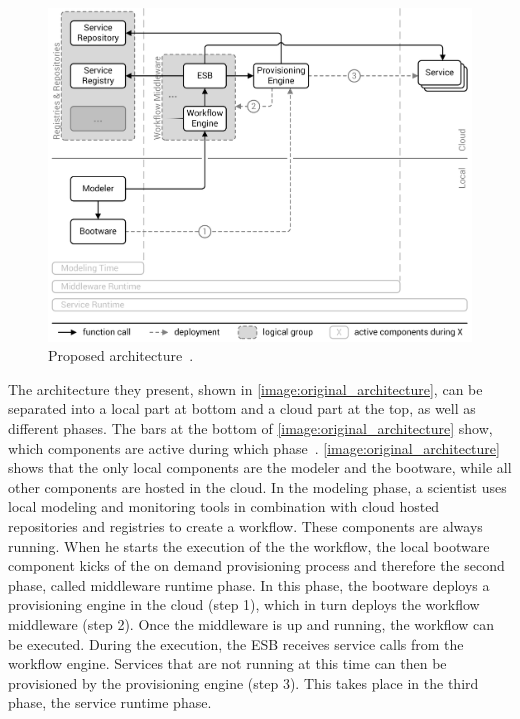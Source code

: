 \begin{figure}[!htbp]
	\centering
	\includegraphics[resolution=600]{previous/assets/original_architecture}
	\caption{Proposed architecture~\autocite[based on][]{provisioning:ondemand}.}
	\label{image:original_architecture}
\end{figure}

The architecture they present, shown in \autoref{image:original_architecture}, can be separated into a local part at bottom and a cloud part at the top, as well as different phases.
The bars at the bottom of \autoref{image:original_architecture} show, which components are active during which phase~\autocite{provisioning:ondemand}.
\autoref{image:original_architecture} shows that the only local components are the modeler and the bootware, while all other components are hosted in the cloud.
In the modeling phase, a scientist uses local modeling and monitoring tools in combination with cloud hosted repositories and registries to create a workflow.
These components are always running.
When he starts the execution of the the workflow, the local bootware component kicks of the on demand provisioning process and therefore the second phase, called middleware runtime phase.
In this phase, the bootware deploys a provisioning engine in the cloud (step 1), which in turn deploys the workflow middleware (step 2).
Once the middleware is up and running, the workflow can be executed. During the execution, the ESB receives service calls from the workflow engine.
Services that are not running at this time can then be provisioned by the provisioning engine (step 3).
This takes place in the third phase, the service runtime phase.

